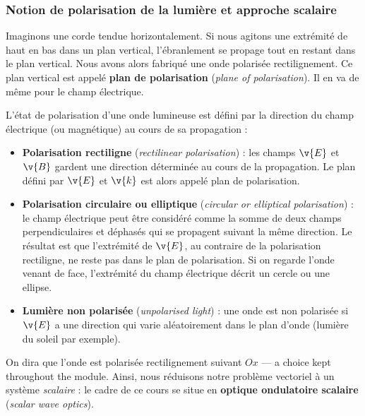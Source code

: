 \subsubsection{Notion de polarisation de la lumière et approche scalaire}

Imaginons une corde tendue horizontalement. Si nous agitons une extrémité de
haut en bas dans un plan vertical, l'ébranlement se propage tout en restant dans
le plan vertical. Nous avons alors fabriqué une onde polarisée rectilignement. Ce
plan vertical est appelé \textbf{plan de polarisation} (\textit{plane of
polarisation}). Il en va de même pour le champ électrique.

\begin{definition}
  L'état de polarisation d'une onde lumineuse est défini par la direction du
  champ électrique (ou magnétique) au cours de sa propagation :
  \begin{itemize}
    \item \textbf{Polarisation rectiligne} (\textit{rectilinear polarisation}) :
      les champs $\v{E}$ et $\v{B}$ gardent une direction déterminée au cours
      de la propagation. Le plan défini par $\v{E}$ et $\v{k}$ est alors appelé
      plan de polarisation.
    \item \textbf{Polarisation circulaire ou elliptique} (\textit{circular or
      elliptical polarisation}) : le champ électrique peut être considéré comme
      la somme de deux champs perpendiculaires et déphasés qui se propagent
      suivant la même direction. Le résultat est que l'extrémité de $\v{E}$, au
      contraire de la polarisation rectiligne, ne reste pas dans le plan de
      polarisation. Si on regarde l'onde venant de face, l'extrémité du champ
      électrique décrit un cercle ou une ellipse.
    \item \textbf{Lumière non polarisée} (\textit{unpolarised light}) : une
      onde est non polarisée si $\v{E}$ a une direction qui varie aléatoirement
      dans le plan d'onde (lumière du soleil par exemple).
  \end{itemize}
\end{definition}

\begin{notation}
  On dira que l'onde est polarisée rectilignement suivant $Ox$ --- a choice
  kept throughout the module. Ainsi, nous réduisons notre problème vectoriel à
  un système \emph{scalaire} : le cadre de ce cours se situe en
  \textbf{optique ondulatoire scalaire} (\textit{scalar wave optics}).
\end{notation}

